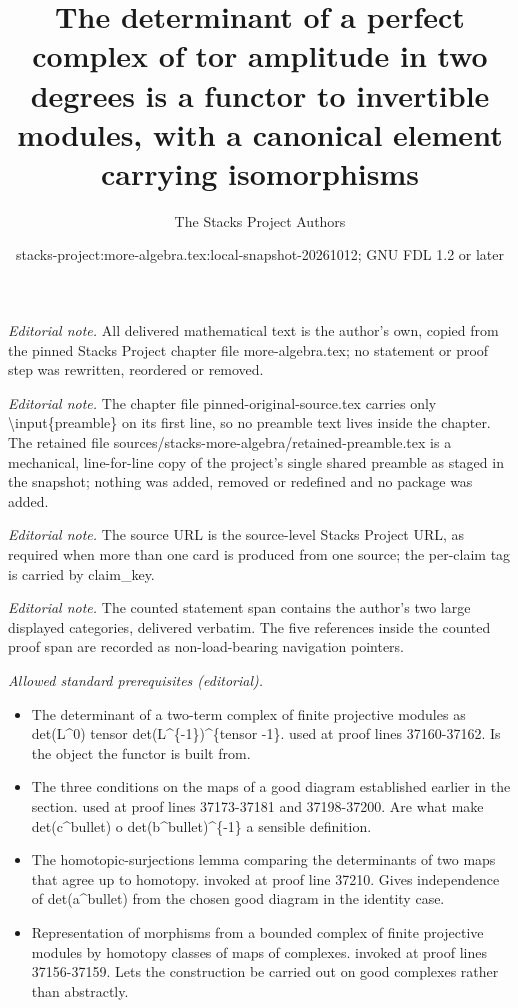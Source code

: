 \documentclass[10pt,a4paper]{amsart}
\title{The determinant of a perfect complex of tor amplitude in two degrees is a functor to invertible modules, with a canonical element carrying isomorphisms}
\author{The Stacks Project Authors}
\date{stacks-project:more-algebra.tex:local-snapshot-20261012; GNU FDL 1.2 or later}
\theoremstyle{plain}
\theoremstyle{definition}
\theoremstyle{remark}
\numberwithin{equation}{subsection}
\begin{document}
\maketitle
\setcounter{subsection}{1}
\noindent\textit{Editorial note.} All delivered mathematical text is the author's own, copied from the pinned Stacks Project chapter file more-algebra.tex; no statement or proof step was rewritten, reordered or removed.\par\medskip
\noindent\textit{Editorial note.} The chapter file pinned-original-source.tex carries only \textbackslash{}input\{preamble\} on its first line, so no preamble text lives inside the chapter. The retained file sources/stacks-more-algebra/retained-preamble.tex is a mechanical, line-for-line copy of the project's single shared preamble as staged in the snapshot; nothing was added, removed or redefined and no package was added.\par\medskip
\noindent\textit{Editorial note.} The source URL is the source-level Stacks Project URL, as required when more than one card is produced from one source; the per-claim tag is carried by claim\_key.\par\medskip
\noindent\textit{Editorial note.} The counted statement span contains the author's two large displayed categories, delivered verbatim. The five references inside the counted proof span are recorded as non-load-bearing navigation pointers.\par\medskip
\noindent\textit{Allowed standard prerequisites (editorial).}\begin{itemize}
\item The determinant of a two-term complex of finite projective modules as det(L\textasciicircum{}0) tensor det(L\textasciicircum{}\{-1\})\textasciicircum{}\{tensor -1\}. used at proof lines 37160-37162. Is the object the functor is built from.
\item The three conditions on the maps of a good diagram established earlier in the section. used at proof lines 37173-37181 and 37198-37200. Are what make det(c\textasciicircum{}bullet) o det(b\textasciicircum{}bullet)\textasciicircum{}\{-1\} a sensible definition.
\item The homotopic-surjections lemma comparing the determinants of two maps that agree up to homotopy. invoked at proof line 37210. Gives independence of det(a\textasciicircum{}bullet) from the chosen good diagram in the identity case.
\item Representation of morphisms from a bounded complex of finite projective modules by homotopy classes of maps of complexes. invoked at proof lines 37156-37159. Lets the construction be carried out on good complexes rather than abstractly.
\end{itemize}\medskip
\end{document}
